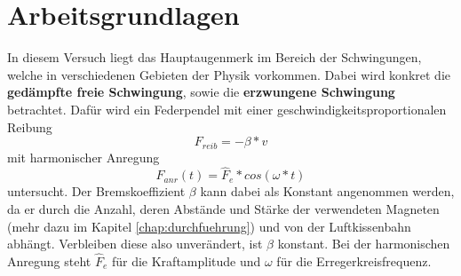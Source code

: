 \chapter{Arbeitsgrundlagen}
\setcounter{page}{1} \thispagestyle{fancy} 
In diesem Versuch liegt das Hauptaugenmerk im Bereich der Schwingungen, welche in verschiedenen Gebieten der Physik vorkommen. Dabei wird konkret die \textbf{gedämpfte freie Schwingung}, sowie die \textbf{erzwungene Schwingung} betrachtet. Dafür wird ein Federpendel mit einer geschwindigkeitsproportionalen Reibung \\
\begin{equation}
F_{reib} = -\beta*v
\end{equation}
mit harmonischer Anregung \\
\begin{equation}
F_{anr}(t) = \hat{F}_{e}*cos(\omega*t)
\end{equation}
untersucht. Der Bremskoeffizient $\beta$ kann dabei als Konstant angenommen werden, da er durch die Anzahl, deren Abstände und Stärke der verwendeten Magneten (mehr dazu im Kapitel \ref{chap:durchfuehrung}) und von der Luftkissenbahn abhängt. Verbleiben diese also unverändert, ist $\beta$ konstant. Bei der harmonischen Anregung steht $\hat{F}_{e}$ für die Kraftamplitude und $\omega$ für die Erregerkreisfrequenz. \cite{w6}\\
